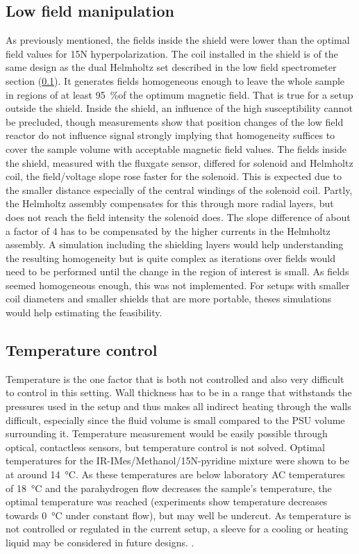         \subsection{Low field manipulation}
            As previously mentioned, the fields inside the shield were lower than the optimal field values for 15N hyperpolarization. The coil installed in the shield is of the same design as the dual Helmholtz set described in the low field spectrometer section (\ref{}). It generates fields homogeneous enough to leave the whole sample in regions of at least \SI{95}{\%}of the optimum magnetic field. That is true for a setup outside the shield. Inside the shield, an influence of the high susceptibility cannot be precluded, though measurements show that position changes of the low field reactor do not influence signal strongly implying that homogeneity suffices to cover the sample volume with acceptable magnetic field values. The fields inside the shield, measured with the fluxgate sensor, differed for solenoid and Helmholtz coil, the field/voltage slope rose faster for the solenoid. This is expected due to the smaller distance especially of the central windings of the solenoid coil. Partly, the Helmholtz assembly compensates for this through more radial layers, but does not reach the field intensity the solenoid does. The slope difference of about a factor of 4 has to be compensated by the higher currents in the Helmholtz assembly. A simulation including the shielding layers would help understanding the resulting homogeneity but is quite complex as iterations over fields would need to be performed until the change in the region of interest is small. As fields seemed homogeneous enough, this was not implemented. For setups with smaller coil diameters and smaller shields that are more portable, theses simulations would help estimating the feasibility.
        \subsection{Temperature control}
            \label{cd:sabreShuttling:tempControl}
            Temperature is the one factor that is both not controlled and also very difficult to control in this setting. Wall thickness has to be in a range that withstands the pressures used in the setup and thus makes all indirect heating through the walls difficult, especially since the fluid volume is small compared to the PSU volume surrounding it. Temperature measurement would be easily possible through optical, contactless sensors, but temperature control is not solved. Optimal temperatures for the IR-IMes/Methanol/15N-pyridine mixture were shown to be at around \SI{14}{\celsius}. As these temperatures are below laboratory AC temperatures of \SI{18}{\celsius} and the parahydrogen flow decreases the sample's temperature, the optimal temperature was reached (experiments show temperature decreases towards \SI{0}{\celsius} under constant flow), but may well be undercut. As temperature is not controlled or regulated in the current setup, a sleeve for a cooling or heating liquid may be considered in future designs. .

